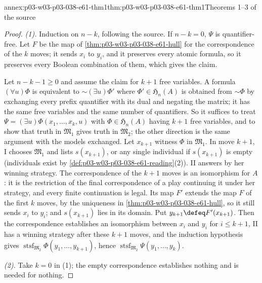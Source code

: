 \begin{annexitem}{annex:p03-w03-p03-038-e61-thm1}{thm:p03-w03-p03-038-e61-thm1}{Theorems 1--3 of the source}
\begin{proof}
\emph{(1).} Induction on \(n-k\), following the source. If \(n-k=0\),
\(\Psi\) is quantifier-free. Let \(F\) be the map of
\cref{thm:p03-w03-p03-038-e61-hull} for the correspondence of the \(k\)
moves; it sends \(x_i\) to \(y_i\), and it preserves every atomic formula,
so it preserves every Boolean combination of them, which gives the claim.

Let \(n-k-1\ge0\) and assume the claim for \(k+1\) free variables. A
formula \((\forall u)\Phi\) is equivalent to \(\sim(\exists u)\Phi'\) where
\(\Phi'\in\mathfrak H_n(A)\) is obtained from \(\sim\Phi\) by exchanging
every prefix quantifier with its dual and negating the matrix; it has the
same free variables and the same number of quantifiers. So it suffices to
treat \(\Psi=(\exists u)\Phi(x_1,\ldots,x_k,u)\) with
\(\Phi\in\mathfrak H_n(A)\) having \(k+1\) free variables, and to show that
truth in \(\mathfrak M_1\) gives truth in \(\mathfrak M_2\); the other
direction is the same argument with the models exchanged. Let
\(x_{k+1}\) witness \(\Phi\) in \(\mathfrak M_1\). In move \(k+1\), I
chooses \(\mathfrak M_1\) and lists \(s(x_{k+1})\), or any single individual
if \(s(x_{k+1})\) is empty (individuals exist by
\cref{def:p03-w03-p03-038-e61-reading}(2)). II answers by her winning
strategy. The correspondence of the \(k+1\) moves is an isomorphism for
\(A\): it is the restriction of the final correspondence of a play
continuing it under her strategy, and every finite continuation is legal.
Its map \(F'\) extends the map \(F\) of the first \(k\) moves, by the
uniqueness in \cref{thm:p03-w03-p03-038-e61-hull}, so it still sends
\(x_i\) to \(y_i\); and \(s(x_{k+1})\) lies in its domain. Put
\(y_{k+1}\defeq F'(x_{k+1})\). Then the correspondence establishes an
isomorphism between \(x_i\) and \(y_i\) for \(i\le k+1\), II has a winning
strategy after these \(k+1\) moves, and the induction hypothesis gives
\(\operatorname{stsf}_{\mathfrak M_2}\Phi(y_1,\ldots,y_{k+1})\), hence
\(\operatorname{stsf}_{\mathfrak M_2}\Psi(y_1,\ldots,y_k)\).

\emph{(2).} Take \(k=0\) in (1); the empty correspondence establishes
nothing and is needed for nothing.


\end{proof}
\end{annexitem}
